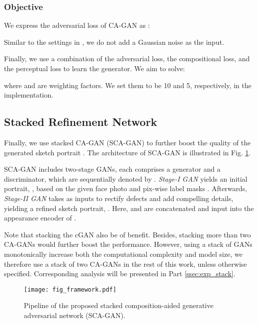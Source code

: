 \documentclass[journal]{IEEEtran}
\begin{document}
\subsubsection{Objective}
\label{sec:objective}

We express the adversarial loss of CA-GAN as \cite{Isola2017Pix2Pix}:

Similar to the settings in \cite{Isola2017Pix2Pix}, we do not add a Gaussian noise  as the input. 

Finally, we use a combination of the adversarial loss, the compositional loss, and the perceptual loss to learn the generator. We aim to solve:

where  and  are weighting factors. We set them to be 10 and 5, respectively, in the implementation.


\subsection{Stacked Refinement Network}
\label{sec:stackgan}

Finally, we use stacked CA-GAN (SCA-GAN) to further boost the quality of the generated sketch portrait \cite{Zhang2017StackGAN}. The architecture of SCA-GAN is illustrated in Fig. \ref{fig:stackcagan}. 

SCA-GAN includes two-stage GANs, each comprises a generator and a discriminator, which are sequentially denoted by . \textit{Stage-I GAN} yields an initial portrait, , based on the given face photo  and pix-wise label masks . Afterwards, \textit{Stage-II GAN} takes  as inputs to rectify defects and add compelling details, yielding a refined sketch portrait, . Here,  and  are concatenated and input into the appearance encoder of . 

Note that stacking the cGAN also be of benefit. Besides, stacking more than two CA-GANs would further boost the performance. However, using a stack of GANs monotonically increase both the computational complexity and model size, we therefore use a stack of two CA-GANs in the rest of this work, unless otherwise specified. Corresponding analysis will be presented in Part \ref{ssec:exp_stack}. 


\begin{figure}
\begin{center}
\texttt{[image: fig\_framework.pdf]}
\end{center}
   \vspace{-0.4cm}
   \caption{Pipeline of the proposed stacked composition-aided generative adversarial network (SCA-GAN).}
\label{fig:stackcagan}
   \vspace{-0.4cm}
\end{figure}
\end{document}
